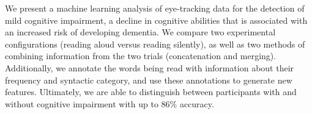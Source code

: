 We present a machine learning analysis of eye-tracking data for the detection of mild cognitive impairment, a decline in cognitive abilities that is associated with an increased risk of developing dementia. We compare two experimental configurations (reading aloud versus reading silently), as well as two methods of combining information from the two trials (concatenation and merging). Additionally, we annotate the words being read with information about their frequency and syntactic category, and use these annotations to generate new features. Ultimately, we are able to distinguish between participants with and without cognitive impairment with up to 86\% accuracy.
